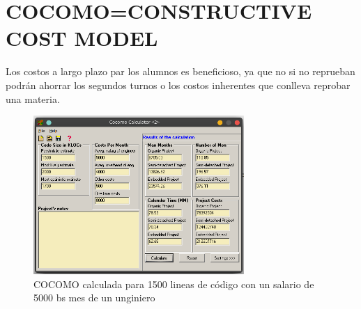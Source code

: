 \chapter*{COCOMO=CONSTRUCTIVE COST MODEL}
Los costos a largo plazo par los alumnos es beneficioso, ya que no si no reprueban podrán ahorrar los segundos turnos o los costos inherentes que conlleva reprobar una materia.
\begin{figure}[h]
	\centering
	\includegraphics[width=8cm]{images/cocomo}
	\caption{COCOMO calculada para 1500 lineas de código con un salario de 5000 bs mes de un unginiero}
	\end{figure}